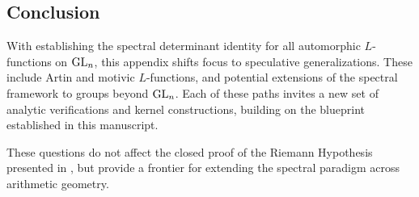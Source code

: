 \subsection*{Conclusion}

With  establishing the spectral determinant identity for all automorphic \( L \)-functions on \( \mathrm{GL}_n \), this appendix shifts focus to speculative generalizations. These include Artin and motivic \( L \)-functions, and potential extensions of the spectral framework to groups beyond \( \mathrm{GL}_n \). Each of these paths invites a new set of analytic verifications and kernel constructions, building on the blueprint established in this manuscript.

\medskip
\noindent
These questions do not affect the closed proof of the Riemann Hypothesis presented in , but provide a frontier for extending the spectral paradigm across arithmetic geometry.
